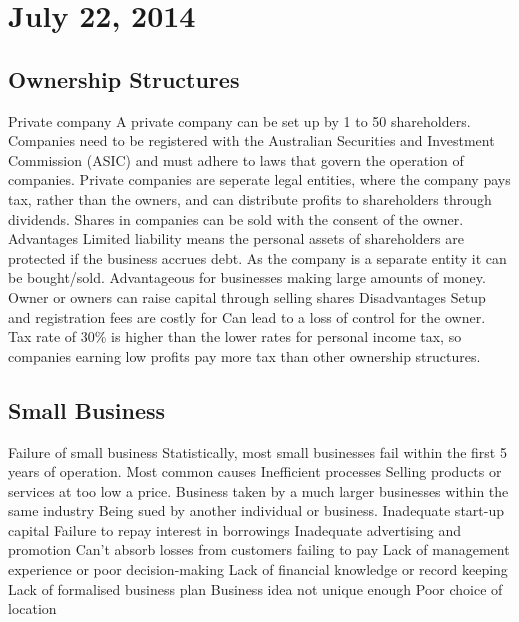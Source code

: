 \section{July 22, 2014}

\subsection{Ownership Structures}
\begin{outline}
\1 Private company
\2 A private company can be set up by 1 to 50 shareholders. Companies need to be registered with the Australian Securities and Investment Commission (ASIC) and must adhere to laws that govern the operation of companies. Private companies are seperate legal entities, where the company pays tax, rather than the owners, and can distribute profits to shareholders through dividends. Shares in companies can be sold with the consent of the owner.
\2 Advantages
\3 Limited liability means the personal assets of shareholders are protected if the business accrues debt.
\3 As the company is a separate entity it can be bought/sold.
\3 Advantageous for businesses making large amounts of money.
\3 Owner or owners can raise capital through selling shares
\2 Disadvantages
\3 Setup and registration fees are costly for 
\3 Can lead to a loss of control for the owner.
\3 Tax rate of 30\% is higher than the lower rates for personal income tax, so companies earning low profits pay more tax than other ownership structures.
\end{outline}

\subsection{Small Business}
\begin{outline}
\1 Failure of small business
\2 Statistically, most small businesses fail within the first 5 years of operation.
\3 Most common causes
\4 Inefficient processes
\4 Selling products or services at too low a price.
\4 Business taken by a much larger businesses within the same industry
\4 Being sued by another individual or business.
\4 Inadequate start-up capital
\4 Failure to repay interest in borrowings
\4 Inadequate advertising and promotion
\4 Can't absorb losses from customers failing to pay
\4 Lack of management experience or poor decision-making
\4 Lack of financial knowledge or record keeping
\4 Lack of formalised business plan
\4 Business idea not unique enough
\4 Poor choice of location
\end{outline}

